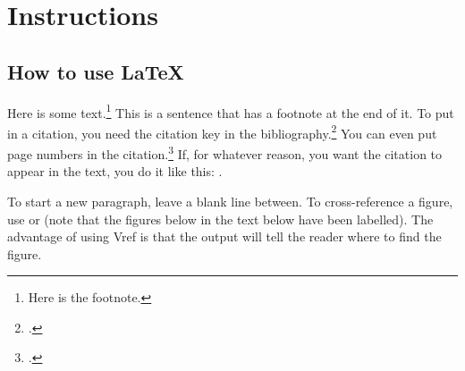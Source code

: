 \chapter{Instructions} \label{inst}

\section{How to use LaTeX}

Here is some text.\footnote{Here is the footnote.} This is a sentence that has a footnote at the end of it. To put in a citation, you need the citation key in the bibliography.\footcites{oecd2015,goss2016} You can even put page numbers in the citation.\footcite[][19--21]{wu2010} If, for whatever reason, you want the citation to appear in the text, you do it like this: \textcite{marks2015}.

To start a new paragraph, leave a blank line between. To cross-reference a figure, use  or  (note that the figures below in the text below have been labelled). The advantage of using Vref is that the output will tell the reader where to find the figure.

